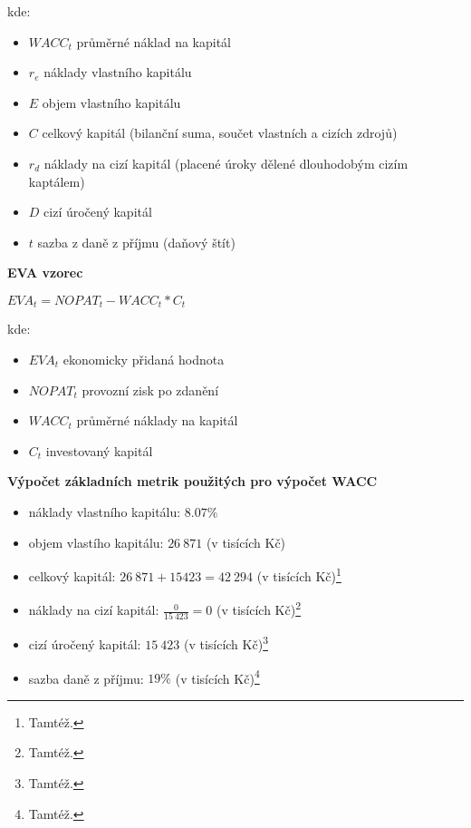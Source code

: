 kde:\\

\begin{itemize}
	\item $WACC_t$ průměrné náklad na kapitál
	\item $r_e$ náklady vlastního kapitálu
	\item $E$ objem vlastního kapitálu
	\item $C$ celkový kapitál (bilanční suma, součet vlastních a cizích zdrojů)
	\item $r_d$ náklady na cizí kapitál (placené úroky dělené dlouhodobým cizím kaptálem)
	\item $D$ cizí úročený kapitál
	\item $t$ sazba z daně z příjmu (daňový štít)
\end{itemize}

\noindent\textbf{EVA vzorec}\\

\begin{center}
$EVA_t = NOPAT_t - WACC_t * C_t$\\
\end{center}

kde:\\

\begin{itemize}
	\item $EVA_t$ ekonomicky přidaná hodnota
	\item $NOPAT_t$ provozní zisk po zdanění
	\item $WACC_t$ průměrné náklady na kapitál
	\item $C_t$ investovaný kapitál
\end{itemize}

\newpage


\noindent\textbf{Výpočet základních metrik použitých pro výpočet WACC}

\begin{itemize}
	\item náklady vlastního kapitálu: $8.07\%$%
	\item objem vlastího kapitálu: $26\ 871$ (v tisících Kč)
	\item celkový kapitál: $26\ 871 + 15 423 = 42\ 294$ (v tisících Kč)\footnote{Tamtéž.}
	\item náklady na cizí kapitál: $\frac{0}{15\ 423} = 0$ (v tisících Kč)\footnote{Tamtéž.}
	\item cizí úročený kapitál: $15\ 423$ (v tisících Kč)\footnote{Tamtéž.}
	\item sazba daně z příjmu: $19\%$ (v tisících Kč)\footnote{Tamtéž.}
\end{itemize}

